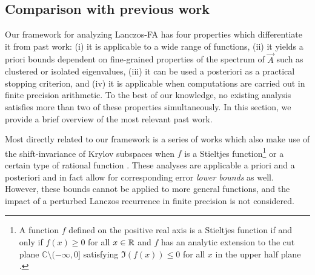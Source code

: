 \subsection{Comparison with previous work}


Our framework for analyzing Lanczos-FA has four properties which differentiate it from past work:
(i) it is applicable to a wide range of functions, 
(ii) it yields a priori bounds dependent on fine-grained properties of the spectrum of \( \vec{A} \) such as clustered or isolated eigenvalues, 
(iii) it can be used a posteriori as a practical stopping criterion,
and (iv) it is applicable when computations are carried out in finite precision arithmetic. %
To the best of our knowledge, no existing analysis satisfies more than two of these properties simultaneously.
In this section, we provide a brief overview of the most relevant past work.

Most directly related to our framework is a series of works which also make use of the shift-invariance of Krylov subspaces when \( f \) is a Stieltjes function\footnote{A function \( f \) defined on the positive real axis is a Stieltjes function if and only if \( f(x) \geq 0 \) for all $x\in\mathbb{R}$ and \( f \) has an analytic extension to the cut plane \( \mathbb{C} \setminus (-\infty,0] \) satisfying \( \Im(f(x)) \leq 0 \) for all \( x \) in the upper half plane \cite[Theorem 3.2]{berg_07} \cite[p. 127 attributed to Krein]{aheizer_65}.} \cite{frommer_guttel_schweitzer_14a,frommer_schweitzer_15,ilic_turner_simpson_09} or a certain type of rational function \cite{frommer_kahl_lippert_rittich_13,frommer_simoncini_08b,frommer_simoncini_09}.
These analyses are applicable a priori and a posteriori and in fact allow for corresponding error \emph{lower bounds} as well.
However, these bounds cannot be applied to more general functions, and the impact of a perturbed Lanczos recurrence in finite precision is not considered.

